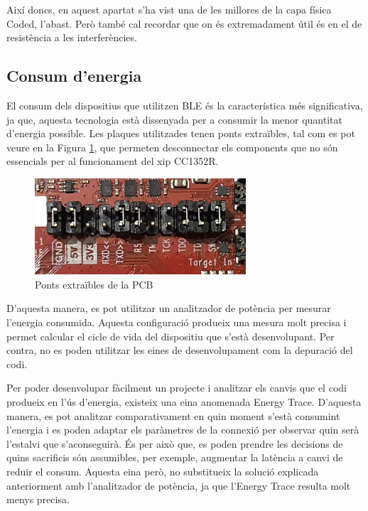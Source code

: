 Així doncs, en aquest apartat s'ha vist una de les millores de la capa física Coded, l'abast.
Però també cal recordar que on és extremadament útil és en el de resistència a les interferències.

\subsection{Consum d'energia}

El consum dels dispositius que utilitzen BLE és la característica més significativa, ja que, aquesta tecnologia està dissenyada per a consumir la menor quantitat d'energia possible.
Les plaques utilitzades tenen ponts extraïbles, tal com es pot veure en la Figura \ref{ponts_extraibles}, que permeten desconnectar els components que no són essencials per al funcionament del xip CC1352R.

\begin{figure}[h]
	\begin{center}
		\includegraphics[width=0.7\textwidth]{./images/ponts.jpg}
		\caption{Ponts extraïbles de la PCB}
		\label{ponts_extraibles}
	\end{center}
\end{figure}

D'aquesta manera, es pot utilitzar un analitzador de potència per mesurar l'energia consumida.
Aquesta configuració produeix una mesura molt precisa i permet calcular el cicle de vida del dispositiu que s'està desenvolupant.
Per contra, no es poden utilitzar les eines de desenvolupament com la depuració del codi.

Per poder desenvolupar fàcilment un projecte i analitzar els canvis que el codi produeix en l'ús d'energia, existeix una eina anomenada Energy Trace.
D'aquesta manera, es pot analitzar comparativament en quin moment s'està consumint l'energia i es poden adaptar els paràmetres de la connexió per observar quin serà l'estalvi que s'aconseguirà.
És per això que, es poden prendre les decisions de quins sacrificis són assumibles, per exemple, augmentar la latència a canvi de reduir el consum.
Aquesta eina però, no substitueix la solució explicada anteriorment amb l'analitzador de potència, ja que l'Energy Trace resulta molt menys precisa.

